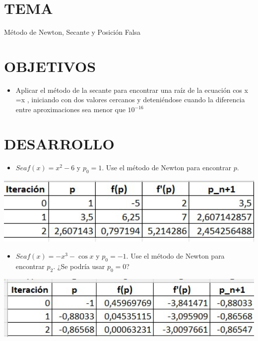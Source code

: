 \documentclass[12pt]{article}
\begin{document}
\section*{TEMA}
{Método de Newton, Secante y Posición Falsa}

\vspace{0.5cm}

\section*{OBJETIVOS}
\begin{itemize}
    \item { Aplicar el método de la secante para encontrar una raíz de la ecuación 
    cos x =x , iniciando con dos valores cercanos y deteniéndose cuando la diferencia entre 
    aproximaciones sea menor que $10^{-16}$}

\end{itemize}

\vspace{0.5cm}

\section*{DESARROLLO}
\begin{itemize}
    \item { $Sea f(x) = x^2 - 6$ y $p_0 = 1$. Use el método de Newton para encontrar $p$.}

\end{itemize}

\begin{minipage}{0.95\textwidth}
    \raggedleft
    \includegraphics[width=1.15\textwidth]{inFiles/Figures/ejer1.jpg}
\end{minipage}

\vspace{0.5cm}
\begin{itemize}
    \item { $Sea f(x) = -x^3 - \cos x$ y $p_0 = -1$. Use el método de Newton para encontrar $p_2$. ¿Se podría usar $p_0 = 0$?
}
\end{itemize}
\begin{minipage}{0.95\textwidth}
    \raggedleft
    \includegraphics[width=1.15\textwidth]{inFiles/Figures/ejer2.jpg}
\end{minipage}
\vspace{1.5cm}
\end{document}
